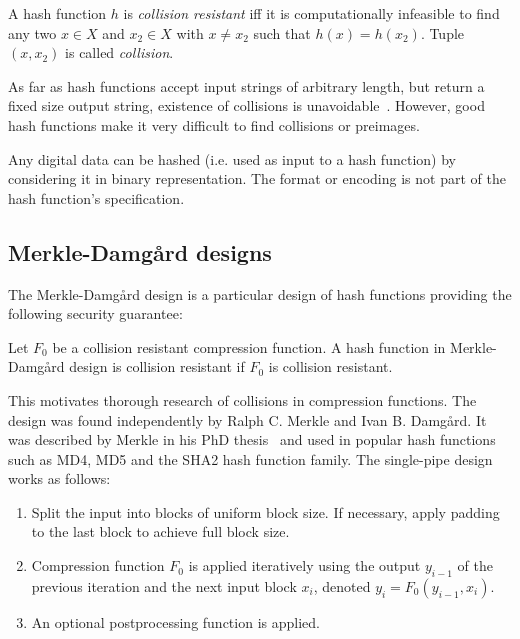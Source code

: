 \begin{defi}
  A hash function $h$ is \emph{collision resistant} iff it is computationally infeasible to
  find any two $x \in X$ and $x_2 \in X$ with $x \neq x_2$ such that $h(x) = h(x_2)$.
  Tuple $(x, x_2)$ is called \emph{collision}.
\end{defi}

As far as hash functions accept input strings of arbitrary length, but return a fixed
size output string, existence of collisions is unavoidable~\cite{schlaffer}.
However, good hash functions make it very difficult to find collisions or preimages.

Any digital data can be hashed (i.e. used as input to a hash function) by considering
it in binary representation. The format or encoding is not part of the hash function's
specification.

\subsection{Merkle-Damg\aa{}rd designs}
\label{sec:hash-md}
%
The Merkle-Damg\aa{}rd design is a particular design of hash functions providing the
following security guarantee:

\begin{defi}
  Let $F_0$ be a collision resistant compression function.
  A hash function in Merkle-Damg\aa{}rd design is collision resistant if $F_0$ is collision resistant.
\end{defi}

This motivates thorough research of collisions in compression functions.
The design was found independently by Ralph C. Merkle and Ivan B. Damg\aa{}rd.
It was described by Merkle in his PhD thesis~\cite[p. 13--15]{merkle1979secrecy}
and used in popular hash functions such as MD4, MD5 and the SHA2 hash function family.
The single-pipe design works as follows:
\begin{enumerate}\itemsep0pt
\item Split the input into blocks of uniform block size.
  If necessary, apply padding to the last block to achieve full block size.
\item Compression function $F_0$ is applied iteratively using the output $y_{i-1}$ of
  the previous iteration and the next input block $x_i$, denoted $y_i = F_0(y_{i-1}, x_i)$.
\item An optional postprocessing function is applied.
\end{enumerate}

